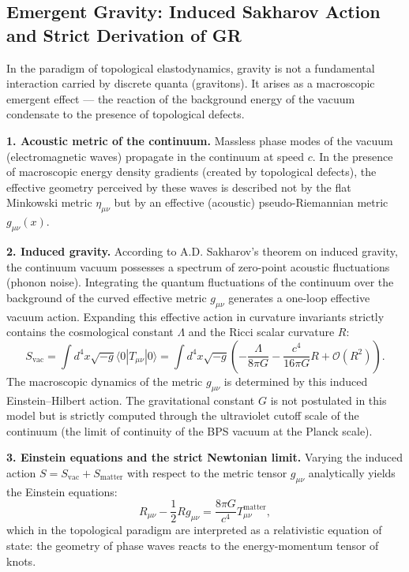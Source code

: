 \documentclass[11pt,a4paper]{article}
\begin{document}
\subsection{Emergent Gravity: Induced Sakharov Action and Strict Derivation of GR}
In the paradigm of topological elastodynamics, gravity is not a fundamental interaction carried by discrete quanta (gravitons). It arises as a macroscopic emergent effect — the reaction of the background energy of the vacuum condensate to the presence of topological defects.

\textbf{1. Acoustic metric of the continuum.}
Massless phase modes of the vacuum (electromagnetic waves) propagate in the continuum at speed $c$. In the presence of macroscopic energy density gradients (created by topological defects), the effective geometry perceived by these waves is described not by the flat Minkowski metric $\eta_{\mu\nu}$ but by an effective (acoustic) pseudo-Riemannian metric $g_{\mu\nu}(x)$.

\textbf{2. Induced gravity.}
According to A.D. Sakharov's theorem on induced gravity, the continuum vacuum possesses a spectrum of zero-point acoustic fluctuations (phonon noise). Integrating the quantum fluctuations of the continuum over the background of the curved effective metric $g_{\mu\nu}$ generates a one-loop effective vacuum action.
Expanding this effective action in curvature invariants strictly contains the cosmological constant $\Lambda$ and the Ricci scalar curvature $R$:
\begin{equation}
S_{\text{vac}} = \int d^4x \sqrt{-g} \langle 0 | T_{\mu\nu} | 0 \rangle = \int d^4x \sqrt{-g} \left( - \frac{\Lambda}{8\pi G} - \frac{c^4}{16\pi G} R + \mathcal{O}(R^2) \right).
\end{equation}
The macroscopic dynamics of the metric $g_{\mu\nu}$ is determined by this induced Einstein–Hilbert action. The gravitational constant $G$ is not postulated in this model but is strictly computed through the ultraviolet cutoff scale of the continuum (the limit of continuity of the BPS vacuum at the Planck scale).

\textbf{3. Einstein equations and the strict Newtonian limit.}
Varying the induced action $S = S_{\text{vac}} + S_{\text{matter}}$ with respect to the metric tensor $g_{\mu\nu}$ analytically yields the Einstein equations:
\begin{equation}
R_{\mu\nu} - \frac{1}{2}R g_{\mu\nu} = \frac{8\pi G}{c^4} T_{\mu\nu}^{\text{matter}},
\end{equation}
which in the topological paradigm are interpreted as a relativistic equation of state: the geometry of phase waves reacts to the energy-momentum tensor of knots.
\end{document}
